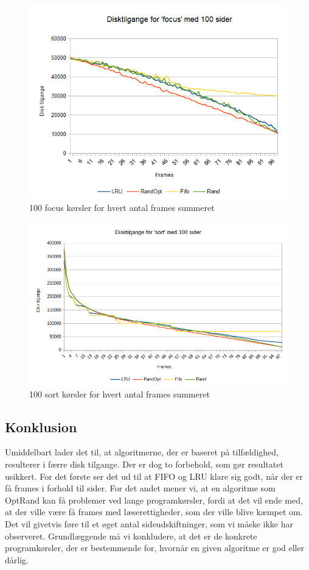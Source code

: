 \begin{figure}[ht]
\centerline{\includegraphics[scale=0.8]{graph/stat_focus}}
\caption{100 focus kørsler for hvert antal frames summeret}
\label{fig:focus}
\end{figure}

\begin{figure}[ht]
\centerline{\includegraphics[scale=0.8]{graph/stat_sort}}
\caption{100 sort kørsler for hvert antal frames summeret}
\label{fig:sort}
\end{figure}

\subsection{Konklusion}
Umiddelbart lader det til, at algoritmerne, der er baseret på tilfældighed, resulterer i færre disk tilgange. Der er dog to forbehold, som gør resultatet usikkert. For det første ser det ud til at FIFO og LRU klare sig godt, når der er få frames i forhold til sider. For det andet mener vi, at en algoritme som OptRand kan få problemer ved lange programkørsler, fordi at det vil ende med, at der ville være få frames med læserettigheder, som der ville blive kæmpet om. Det vil givetvis føre til et øget antal sideudskiftninger, som vi måske ikke har observeret. Grundlæggende må vi konkludere, at det er de konkrete programkørsler, der er bestemmende for, hvornår en given algoritme er god eller dårlig.
